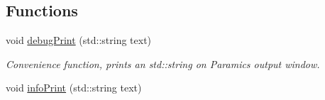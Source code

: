 \subsection*{Functions}
\begin{DoxyCompactItemize}
\item 
void \hyperlink{namespacetraci__api_a8179b41c12626fc5444d12ee3a6f19cb}{debug\+Print} (std\+::string text)
\begin{DoxyCompactList}\small\item\em Convenience function, prints an std\+::string on Paramics\textquotesingle{} output window. \end{DoxyCompactList}\item 
void \hyperlink{namespacetraci__api_a3d103fa606d4762c375bac42c66f62a8}{info\+Print} (std\+::string text)
\end{DoxyCompactItemize}
